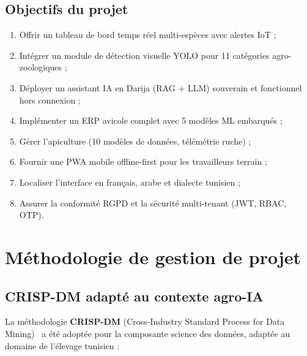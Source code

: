 \documentclass[12pt,a4paper,twoside]{report}
\begin{document}
\subsection{Objectifs du projet}
\begin{enumerate}
  \item Offrir un tableau de bord temps réel multi-espèces avec alertes IoT ;
  \item Intégrer un module de détection visuelle YOLO pour 11 catégories
        agro-zoologiques ;
  \item Déployer un assistant IA en Darija (RAG + LLM) souverain et
        fonctionnel hors connexion ;
  \item Implémenter un ERP avicole complet avec 5 modèles ML embarqués ;
  \item Gérer l'apiculture (10 modèles de données, télémétrie ruche) ;
  \item Fournir une PWA mobile offline-first pour les travailleurs terrain ;
  \item Localiser l'interface en français, arabe et dialecte tunisien ;
  \item Assurer la conformité RGPD et la sécurité multi-tenant (JWT, RBAC, OTP).
\end{enumerate}

\section{Méthodologie de gestion de projet}

\subsection{CRISP-DM adapté au contexte agro-IA}

La méthodologie \textbf{CRISP-DM} (Cross-Industry Standard Process for
Data Mining)~\cite{wirth2000} a été adoptée pour la composante science des
données, adaptée au domaine de l'élevage tunisien :
\end{document}
